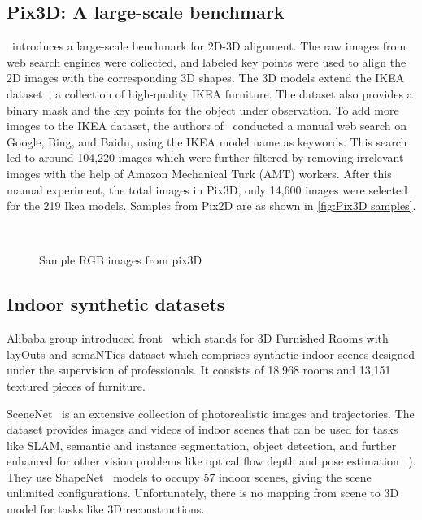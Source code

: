 \subsection{Pix3D: A large-scale benchmark}\label{sec:pix3d}
~\cite{Sun2018}introduces a large-scale benchmark for 2D-3D alignment.
The raw images from web search engines were collected, and labeled key points were used to align the 2D images with the corresponding 3D shapes.
The 3D models extend the IKEA dataset~\cite{Lim2013}, a collection of high-quality IKEA furniture.
The dataset also provides a binary mask and the key points for the object under observation.
To add more images to the IKEA dataset, the authors of~\cite{Sun2018} conducted a manual web search on Google, Bing, and Baidu, using the IKEA model name as keywords.
This search led to around 104,220 images which were further filtered by removing irrelevant images with the help of Amazon Mechanical Turk (AMT) workers.
After this manual experiment, the total images in Pix3D, only 14,600 images were selected for the 219 Ikea models.
Samples from Pix2D are as shown in \autoref{fig:Pix3D samples}.

\begin{figure}[!ht]
    \centering
    \quad
    \\
    \quad
    \caption{Sample RGB images from pix3D}
    \label{fig:Pix3D samples}
\end{figure}

\subsection{Indoor synthetic datasets}\label{subsec:indoor-synthetic-datasets}
Alibaba group introduced \gls{front}~\cite{Fu20203DFRONT3F} which stands for 3D Furnished Rooms with layOuts and semaNTics dataset which comprises
synthetic indoor scenes designed under the supervision of professionals.
It consists of 18,968 rooms and 13,151 textured pieces of furniture.

SceneNet~\cite{McCormac2017} is an extensive collection of photorealistic images and trajectories.
The dataset provides images and videos of indoor scenes that can be used for tasks like SLAM,
semantic and instance segmentation, object detection, and further enhanced for other vision problems like optical flow depth and pose estimation ~\cite{McCormac2017}).
They use ShapeNet~\cite{shapenet2015} models to occupy 57 indoor scenes, giving the scene unlimited configurations.
Unfortunately, there is no mapping from scene to 3D model for tasks like 3D reconstructions.

